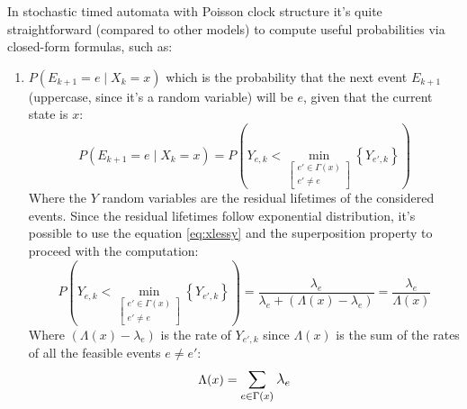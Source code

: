 \documentclass[12pt,a4paper]{article}
\begin{document}
\bigskip
\noindent
In stochastic timed automata with Poisson clock structure it's quite straightforward (compared to other models) to compute useful probabilities via closed-form formulas, such as:
\begin{enumerate}
\item $P(E_{k+1}=e \mid X_k=x)$ which is the probability that the next event $E_{k+1}$ (uppercase, since it's a random variable) will be $e$, given that the current state is $x$:
$$
P(E_{k+1}=e \mid X_k=x)=P\left(Y_{e,k} <
\min_{\left[
\begin{matrix}
e'\in \Gamma(x) \\
e'\neq e
\end{matrix}
\right]}
\left\lbrace Y_{e',k}\right\rbrace \right)
$$
Where the $Y$ random variables are the residual lifetimes of the considered events. Since the residual lifetimes follow exponential distribution, it's possible to use the equation \ref{eq:xlessy} and the superposition property to proceed with the computation:
\begin{equation}
P\left(Y_{e,k} <
\min_{\left[
\begin{matrix}
e'\in \Gamma(x) \\
e'\neq e
\end{matrix}
\right]}
\left\lbrace Y_{e',k}\right\rbrace \right)
=\frac{\lambda_e}{\lambda_e+(\Lambda(x)-\lambda_e)}=\frac{\lambda_e}{\Lambda(x)}
\end{equation}
\noindent
Where $(\Lambda(x)-\lambda_e)$ is the rate of $Y_{e',k}$ since $\Lambda(x)$ is the sum of the rates of all the feasible events $e \neq e'$:
$$
\Lambda(x) = \mathlarger{\sum_{e \in \Gamma(x)}\lambda_e}
$$


\end{enumerate}
\end{document}
